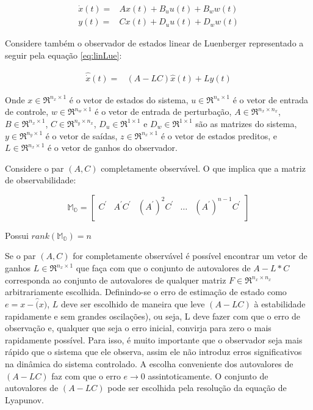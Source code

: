 \begin{equation}\label{eq:linsys}
  \begin{split}
    \dot{x}(t)=&Ax(t)+B_uu(t)+B_ww(t)\\
       y(t)=&Cx(t)+D_uu(t)+D_ww(t)
  \end{split}
\end{equation}

Considere também o observador de estados linear de Luenberger representado a seguir pela equação \eqref{eq:linLue}: 

\begin{equation}\label{eq:linLue}
  \begin{split}
    \hat{\dot{x}}(t)=&(A-LC)\hat{x}(t) + Ly(t) 
  \end{split}
\end{equation}

Onde $x \in \Re^{n_{x} \times 1}$ é o vetor de estados do sistema, $u \in \Re^{n_{u} \times 1}$ é o vetor de entrada de controle, $w \in \Re^{n_{w} \times 1}$ é o vetor de entrada de perturbação, $A \in \Re^{n_{x} \times n_{x}}$, $B \in \Re^{n_{x} \times 1}$, $C \in \Re^{n_{y} \times n_{x}}$, $D_u \in \Re^{1 \times 1}$ e $D_w \in \Re^{1 \times 1}$ são as matrizes do sistema, $y \in \Re^{{n_{y} \times 1}}$ é o vetor de saídas, $z \in \Re^{n_{x} \times 1}$ é o vetor de estados preditos, e $L\in \Re^{n_{x} \times 1}$ é o vetor de ganhos do observador.

Considere o par $(A,C)$ completamente observável. O que implica que a matriz de observabilidade:

\begin{equation}\label{eq:Matrix:MO}
  \mathbb{M_O}=
  \begin{bmatrix}
    C^'&A^'C^'&(A^')^2C^'&\dots&(A^')^{n-1}C^'\\
  \end{bmatrix}    
\end{equation}

Possui $rank(\mathbb{M_O}) = n$
 
Se o par $(A,C)$ for completamente observável é possível encontrar um vetor de ganhos $L\in \Re^{n_{x} \times 1}$ que faça com que o conjunto de autovalores de $A-L*C$ corresponda ao conjunto de autovalores de qualquer matriz $F \in \Re^{n_{x} \times n_{x}}$ arbitrariamente escolhida. 
Definindo-se o erro de estimação de estado como $e=x-\hat(x)$, $L$ deve ser escolhido de maneira que leve $(A-LC)$ à estabilidade rapidamente e sem grandes oscilações), ou seja, L deve fazer com que o erro de observação e,
qualquer que seja o erro inicial, convirja para zero o mais rapidamente possível. Para isso, é muito importante que o observador seja mais rápido 
que o sistema que ele observa, assim ele não introduz erros significativos na dinâmica do sistema controlado. A escolha conveniente dos autovalores de $(A-LC)$ faz com que o erro $e\rightarrow0$ assintoticamente. 
O conjunto de autovalores de $(A-LC)$ pode ser escolhida pela resolução da equação de Lyapunov.
  
